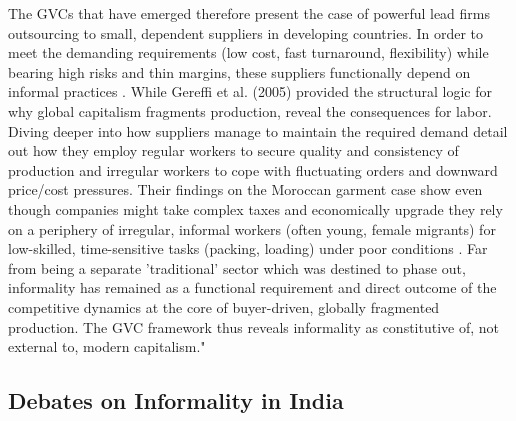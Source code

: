 The GVCs that have emerged therefore present the case of powerful lead firms outsourcing to small, dependent suppliers in developing countries. In order to meet the demanding requirements (low cost, fast turnaround, flexibility) while bearing high risks and thin margins, these suppliers functionally depend on informal practices \parencite{gereffi2005governance}. While Gereffi et al. (2005) provided the structural logic for why global capitalism fragments production, \textcite{barrientos2011economic} reveal the consequences for labor. Diving deeper into how suppliers manage to maintain the required demand detail out how they employ regular workers to secure quality and consistency of production and irregular workers to cope with fluctuating orders and downward price/cost pressures. Their findings on the Moroccan garment case show even though companies might take complex taxes and economically upgrade they rely on a periphery of irregular, informal workers (often young, female migrants) for low-skilled, time-sensitive tasks (packing, loading) under poor conditions \parencite{barrientos2011economic}. Far from being a separate 'traditional' sector which was destined to phase out, informality has remained as a functional requirement and direct outcome of the competitive dynamics at the core of buyer-driven, globally fragmented production. The GVC framework thus reveals informality as constitutive of, not external to, modern capitalism."


\subsection{Debates on Informality in India}

